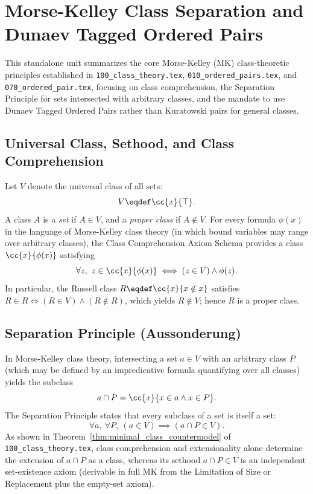 \def\topic{Morse-Kelley class comprehension, separation, and Dunaev tagged ordered pairs}

\section{Morse-Kelley Class Separation and Dunaev Tagged Ordered Pairs}
\label{sec:mk_classes_audit_summary}

This standalone unit summarizes the core Morse-Kelley (MK) class-theoretic
principles established in \texttt{100\_class\_theory.tex}, \texttt{010\_ordered\_pairs.tex},
and \texttt{070\_ordered\_pair.tex}, focusing on class comprehension, the
Separation Principle for sets intersected with arbitrary classes, and the
mandate to use Dunaev Tagged Ordered Pairs rather than Kuratowski pairs for
general classes.

\subsection{Universal Class, Sethood, and Class Comprehension}

Let $V$ denote the universal class of all sets:
\[
V \eqdef \cc{x}{\top}.
\]
A class $A$ is a \emph{set} if $A \in V$, and a \emph{proper class} if $A \notin V$.
For every formula $\phi(x)$ in the language of Morse-Kelley class theory (in
which bound variables may range over arbitrary classes), the Class Comprehension
Axiom Schema provides a class $\cc{x}{\phi(x)}$ satisfying
\[
\forall z,\ z \in \cc{x}{\phi(x)} \iff (z \in V) \land \phi(z).
\]
In particular, the Russell class $R \eqdef \cc{x}{x \notin x}$ satisfies
$R \in R \iff (R \in V) \land (R \notin R)$, which yields $R \notin V$; hence $R$
is a proper class.

\subsection{Separation Principle (Aussonderung)}

In Morse-Kelley class theory, intersecting a set $a \in V$ with an arbitrary
class $P$ (which may be defined by an impredicative formula quantifying over all
classes) yields the subclass
\[
a \cap P = \cc{x}{x \in a \land x \in P}.
\]
The Separation Principle states that every subclass of a set is itself a set:
\[
\forall a,\ \forall P,\ (a \in V) \implies (a \cap P \in V).
\]
As shown in Theorem~\ref{thm:minimal_class_countermodel} of \texttt{100\_class\_theory.tex},
class comprehension and extensionality alone determine the extension of $a \cap P$
as a class, whereas its sethood $a \cap P \in V$ is an independent set-existence
axiom (derivable in full MK from the Limitation of Size or Replacement plus the
empty-set axiom).

